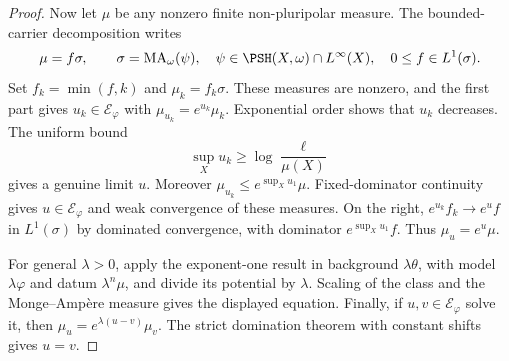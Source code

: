 \begin{proof}
Now let $\mu$ be any nonzero finite non-pluripolar measure. The bounded-carrier decomposition writes
\[
 \mu=f\sigma,\qquad
 \sigma=\mathrm{MA}_\omega(\psi),\quad
 \psi\in\PSH(X,\omega)\cap L^\infty(X),\quad
 0\leq f\in L^1(\sigma).
\]
Set $f_k=\min(f,k)$ and $\mu_k=f_k\sigma$. These measures are nonzero, and the first part gives $u_k\in\mathcal E_\varphi$ with $\mu_{u_k}=e^{u_k}\mu_k$. Exponential order shows that $u_k$ decreases. The uniform bound
\[
 \sup_Xu_k\geq\log\frac{\ell}{\mu(X)}
\]
gives a genuine limit $u$. Moreover $\mu_{u_k}\leq e^{\sup_Xu_1}\mu$. Fixed-dominator continuity gives $u\in\mathcal E_\varphi$ and weak convergence of these measures. On the right,
$e^{u_k}f_k\to e^u f$ in $L^1(\sigma)$ by dominated convergence, with dominator $e^{\sup_Xu_1}f$. Thus $\mu_u=e^u\mu$.

For general $\lambda>0$, apply the exponent-one result in background $\lambda\theta$, with model $\lambda\varphi$ and datum $\lambda^n\mu$, and divide its potential by $\lambda$. Scaling of the class and the Monge--Amp\`ere measure gives the displayed equation. Finally, if $u,v\in\mathcal E_\varphi$ solve it, then $\mu_u=e^{\lambda(u-v)}\mu_v$. The strict domination theorem with constant shifts gives $u=v$.
\end{proof}

